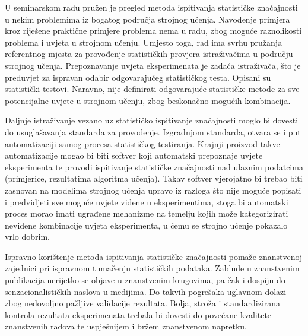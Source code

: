 U seminarskom radu pružen je pregled metoda ispitivanja statističke značajnosti u nekim problemima iz bogatog područja strojnog učenja. Navođenje primjera kroz riješene praktične primjere problema nema u radu, zbog moguće raznolikosti problema i uvjeta u strojnom učenju. Umjesto toga, rad ima svrhu pružanja referentnog mjesta za provođenje statističkih provjera istraživačima u području strojnog učenja. Prepoznavanje uvjeta eksperimenata je zadaća istraživača, što je preduvjet za ispravan odabir odgovarajućeg statističkog testa. Opisani su statistički testovi. Naravno, nije definirati odgovarajuće statističke metode za sve potencijalne uvjete u strojnom učenju, zbog beskonačno mogućih kombinacija. 

Daljnje istraživanje vezano uz statističko ispitivanje značajnosti moglo bi dovesti do usuglašavanja standarda za provođenje. Izgradnjom standarda, otvara se i put automatizaciji samog procesa statističkog testiranja. Krajnji proizvod takve automatizacije mogao bi biti softver koji automatski prepoznaje uvjete eksperimenta te provodi ispitivanje statističke značajnosti nad ulaznim podatcima (primjerice, rezultatima algoritma učenja). Takav softver vjerojatno bi trebao biti zasnovan na modelima strojnog učenja upravo iz razloga što nije moguće popisati i predvidjeti sve moguće uvjete viđene u eksperimentima, stoga bi automatski proces morao imati ugrađene mehanizme na temelju kojih može kategorizirati neviđene kombinacije uvjeta eksperimenta, u čemu se strojno učenje pokazalo vrlo dobrim.

Ispravno korištenje metoda ispitivanja statističke značajnosti pomaže znanstvenoj zajednici pri ispravnom tumačenju statističkih podataka. Zablude u znanstvenim publikacija nerijetko se objave u znanstvenim krugovima, pa čak i dospiju do senzacionalističkih naslova u medijima. Do takvih pogrešaka uglavnom dolazi zbog nedovoljno pažljive validacije rezultata. Bolja, stroža i standardizirana kontrola rezultata eksperimenata trebala bi dovesti do povećane kvalitete znanstvenih radova te uspješnijem i bržem znanstvenom napretku.